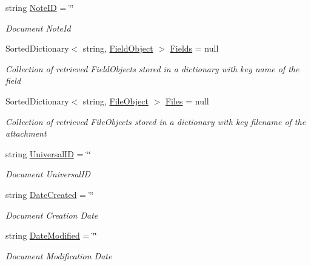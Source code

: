 \begin{DoxyCompactItemize}
string \mbox{\hyperlink{class_document_object_ac447461e3dc7f8258695f902ef0758a7}{Note\+ID}} = \char`\"{}\char`\"{}
\begin{DoxyCompactList}\small\item\em Document Note\+Id \end{DoxyCompactList}\item 
Sorted\+Dictionary$<$ string, \mbox{\hyperlink{class_field_object}{Field\+Object}} $>$ \mbox{\hyperlink{class_document_object_ae203b8a3e40b6c428145d2335b71245c}{Fields}} = null
\begin{DoxyCompactList}\small\item\em Collection of retrieved Field\+Objects stored in a dictionary with key name of the field \end{DoxyCompactList}\item 
Sorted\+Dictionary$<$ string, \mbox{\hyperlink{class_file_object}{File\+Object}} $>$ \mbox{\hyperlink{class_document_object_afe6bcf5175607f91dde768491f23a0a4}{Files}} = null
\begin{DoxyCompactList}\small\item\em Collection of retrieved File\+Objects stored in a dictionary with key filename of the attachment \end{DoxyCompactList}\item 
string \mbox{\hyperlink{class_document_object_a8b96d04632a2802e7cc5466ca5cee8cf}{Universal\+ID}} = \char`\"{}\char`\"{}
\begin{DoxyCompactList}\small\item\em Document Universal\+ID \end{DoxyCompactList}\item 
string \mbox{\hyperlink{class_document_object_a819cb8baad094f6e5990c54ec1eee8b0}{Date\+Created}} = \char`\"{}\char`\"{}
\begin{DoxyCompactList}\small\item\em Document Creation Date \end{DoxyCompactList}\item 
string \mbox{\hyperlink{class_document_object_a87ba1b3ac1b74b104972c25b245c504b}{Date\+Modified}} = \char`\"{}\char`\"{}
\begin{DoxyCompactList}\small\item\em Document Modification Date \end{DoxyCompactList}\end{DoxyCompactItemize}


